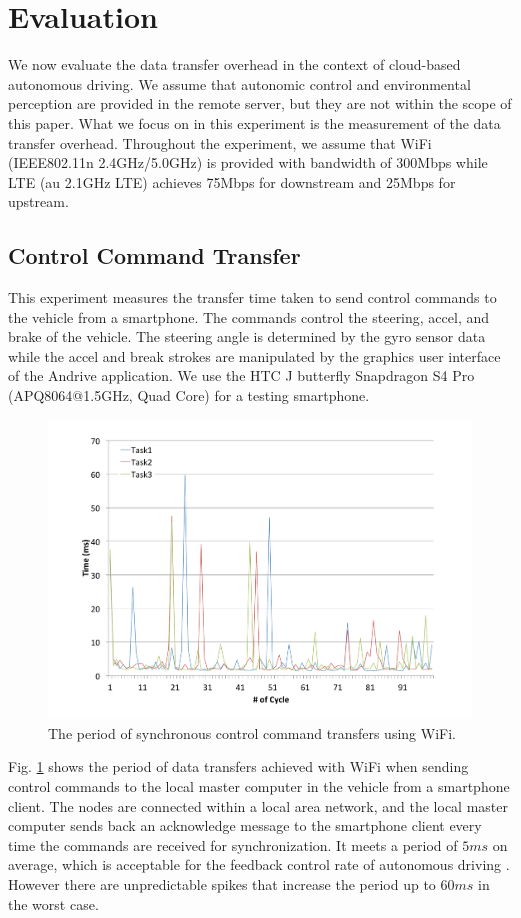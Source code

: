 \section{Evaluation}
\label{sec:evaluation}

We now evaluate the data transfer overhead in the context of cloud-based
autonomous driving.
We assume that autonomic control and environmental perception are
provided in the remote server, but they are not within the scope of this
paper.
What we focus on in this experiment is the measurement of the data
transfer overhead.
Throughout the experiment, we assume that WiFi (IEEE802.11n
2.4GHz/5.0GHz) is provided with bandwidth of 300Mbps while LTE (au
2.1GHz LTE) achieves 75Mbps for downstream and 25Mbps for upstream.


\subsection{Control Command Transfer}

This experiment measures the transfer time taken to send control
commands to the vehicle from a smartphone.
The commands control the steering, accel, and brake of the vehicle.
The steering angle is determined by the gyro sensor data while the accel
and break strokes are manipulated by the graphics user interface of the
Andrive application.
We use the HTC J butterfly Snapdragon S4 Pro (APQ8064@1.5GHz, Quad Core)
for a testing smartphone.

\begin{figure}[!t]
 \centering
 \includegraphics[width=0.8\hsize]{fig/No1_Andrive_serv_cycle_WiFi.pdf}
 \caption{The period of synchronous control command transfers using WiFi.}
 \label{fig:no1}
\end{figure}

Fig. \ref{fig:no1} shows the period of data transfers achieved with WiFi
when sending control commands to the local master computer in the
vehicle from a smartphone client.
The nodes are connected within a local area network, and the local
master computer sends back an acknowledge message to the smartphone
client every time the commands are received for synchronization.
It meets a period of $5ms$ on average, which is acceptable for the
feedback control rate of autonomous driving \cite{Kagami13}.
However there are unpredictable spikes that increase the period up to
$60ms$ in the worst case.

